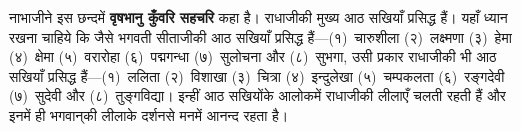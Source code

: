 \begin{sloppypar}\justifying{}
नाभाजीने इस छन्दमें \textbf{वृषभानु कुँवरि सहचरि} कहा है। राधाजीकी मुख्य आठ सखियाँ प्रसिद्ध हैं। यहाँ ध्यान रखना चाहिये कि जैसे भगवती सीताजीकी आठ सखियाँ प्रसिद्ध हैं—(१)~चारुशीला (२)~लक्ष्मणा (३)~हेमा (४)~क्षेमा (५)~वरारोहा (६)~पद्मगन्धा (७)~सुलोचना और (८)~सुभगा, उसी प्रकार राधाजीकी भी आठ सखियाँ प्रसिद्ध हैं—(१)~ललिता (२)~विशाखा (३)~चित्रा (४)~इन्दुलेखा (५)~चम्पकलता (६)~रङ्गदेवी (७)~सुदेवी और (८)~तुङ्गविद्या। इन्हीं आठ सखियोंके आलोकमें राधाजीकी लीलाएँ चलती रहती हैं और इनमें ही भगवान्‌की लीलाके दर्शनसे मनमें आनन्द रहता है।
\end{sloppypar}


